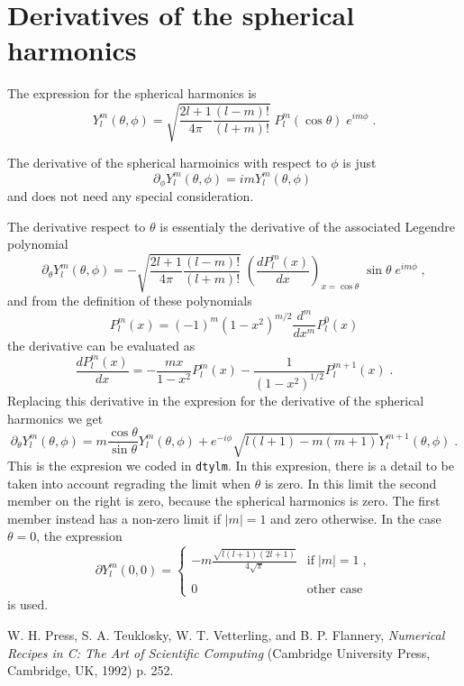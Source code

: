 \documentclass{article}
\begin{document}
\appendix
\section{Derivatives of the spherical harmonics}
\label{dtylm}

The expression for the spherical harmonics is \cite{press}
\[
Y_l^m(\theta,\phi)=\sqrt{\frac{2l+1}{4\pi}\frac{(l-m)!}{(l+m)!}}\;
P_l^m(\cos{\theta})\;e^{im\phi}\;.
\]

The derivative of the spherical harmoinics with respect to $\phi$ is
just
\[
\partial_\phi Y_l^m(\theta,\phi)=i m Y_l^m(\theta,\phi)\;
\]
and does not need any special consideration.

The derivative respect to $\theta$ is essentialy the derivative of the
associated Legendre polynomial
\[
\partial_{\theta}Y_l^m(\theta,\phi)=-
\sqrt{\frac{2l+1}{4\pi}\frac{(l-m)!}{(l+m)!}}\;
\left(\frac{dP_l^m(x)}{dx}\right)_{x=\cos{\theta}}\;\sin{\theta}\;e^{im\phi}\;,
\]
and from the definition of these polynomials
\[
P_l^m(x)=(-1)^m \left(1-x^2\right)^{m/2}\frac{d^{m}}{dx^{m}}P_l^0(x)
\]
the derivative can be evaluated as
\[
\frac{dP_l^m(x)}{dx}=
-\frac{mx}{1-x^2}P_l^m(x)
-\frac{1}{\left(1-x^2\right)^{1/2}}P_l^{m+1}(x)\;.
\]
Replacing this derivative in the expresion for the derivative of the
spherical harmonics we get
\[
\partial_{\theta}Y_l^m(\theta,\phi)=
m\frac{\cos{\theta}}{\sin{\theta}}Y_l^m(\theta,\phi)
+e^{-i\phi}\sqrt{l(l+1)-m(m+1)}Y_l^{m+1}(\theta,\phi)\;.
\]
This is the expresion we coded in \texttt{dtylm}. In this expresion,
there is a detail to be taken into account regrading the limit when
$\theta$ is zero. In this limit the second member on the right is zero,
because the spherical harmonics is zero. The first member instead has
a non-zero limit if $|m|=1$ and zero otherwise.
In the case $\theta=0$, the expression
\[
\partial Y_l^m(0,0)=\left\{
\begin{array}{ll}
\displaystyle 
-m\frac{\sqrt{l(l+1)(2l+1)}}{4\sqrt{\pi}} & \mbox{if}\; |m|=1\;,\\
~\\
\displaystyle 
0& 
\mbox{other case}
\end{array}
\right.
\]
is used.

\begin{thebibliography}{99}
 W. H. Press, S. A. Teuklosky, W. T. Vetterling, and
B. P. Flannery, \textit{Numerical Recipes in C: The Art of Scientific
Computing} (Cambridge University Press, Cambridge, UK, 1992) p. 252.
\end{thebibliography}
\end{document}
